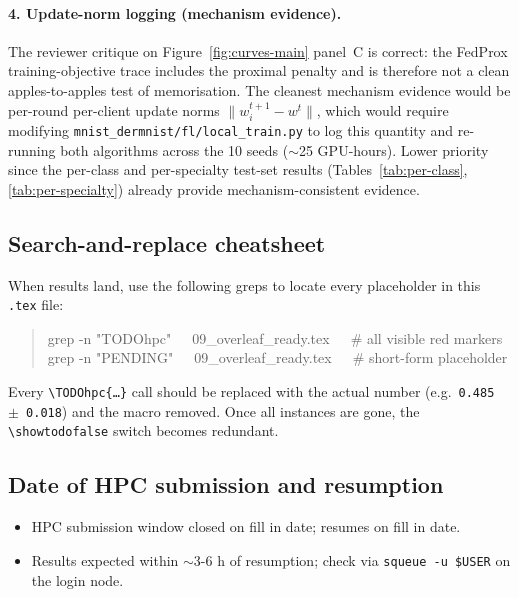 \documentclass[11pt,a4paper]{report}
\newif\ifshowtodo
\newcommand{\TODOhpc}[1]{%
  \ifshowtodo\textcolor{red}{\textbf{[HPC PENDING: #1]}}\else#1\fi}
\begin{document}
\paragraph{4. Update-norm logging (mechanism evidence).} The reviewer
critique on Figure~\ref{fig:curves-main} panel~C is correct: the FedProx
training-objective trace includes the proximal penalty and is therefore
not a clean apples-to-apples test of memorisation. The cleanest mechanism
evidence would be per-round per-client update norms
$\lVert w_i^{t+1} - w^t \rVert$, which would require modifying
\texttt{mnist\_dermnist/fl/local\_train.py} to log this quantity and
re-running both algorithms across the 10 seeds ($\sim$25 GPU-hours).
Lower priority since the per-class and per-specialty test-set results
(Tables~\ref{tab:per-class}, \ref{tab:per-specialty}) already provide
mechanism-consistent evidence.

\subsection*{Search-and-replace cheatsheet}

When results land, use the following greps to locate every placeholder
in this \texttt{.tex} file:
\begin{quote}\small\ttfamily\noindent
grep -n "TODOhpc"~~~09\_overleaf\_ready.tex~~~\# all visible red markers\\
grep -n "PENDING"~~~09\_overleaf\_ready.tex~~~\# short-form placeholder
\end{quote}
Every \texttt{\textbackslash TODOhpc\{\ldots\}} call should be replaced
with the actual number (e.g.\ \texttt{0.485 $\pm$ 0.018}) and the macro
removed. Once all instances are gone, the
\texttt{\textbackslash showtodofalse} switch becomes redundant.

\subsection*{Date of HPC submission and resumption}

\begin{itemize}
\item HPC submission window closed on \TODOhpc{fill in date}; resumes on
  \TODOhpc{fill in date}.
\item Results expected within \TODOhpc{$\sim$3-6 h of resumption}; check
  via \texttt{squeue -u \$USER} on the login node.
\end{itemize}
\fi   %
\end{document}
